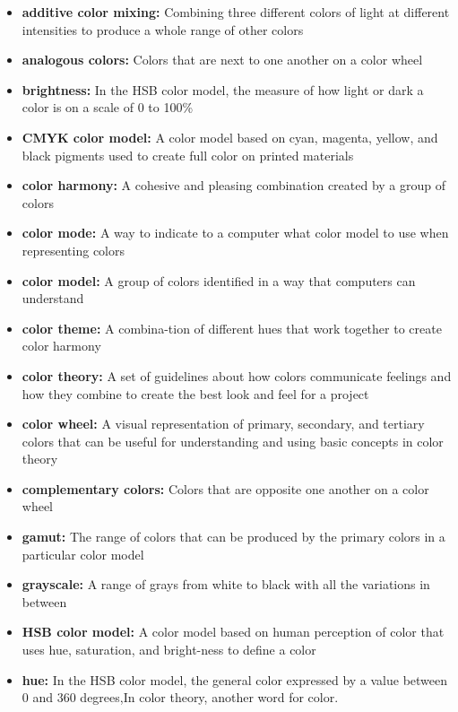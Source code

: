\documentclass{report}
\begin{document}
     \bigbreak \noindent \bigbreak \noindent
    \begin{itemize}
        \item \textbf{additive color mixing:} Combining three different colors of light at different intensities to produce a whole range of other colors
        \item \textbf{analogous colors:} Colors that are next to one another on a color wheel
        \item \textbf{brightness:} In the HSB color model, the measure of how light or dark a color is on a scale of 0 to 100\%
        \item \textbf{CMYK color model:} A color model based on cyan, magenta, yellow, and black pigments used to create full color on printed materials
        \item \textbf{color harmony:} A cohesive and pleasing combination created by a group of colors
        \item \textbf{color mode:} A way to indicate to a computer what color model to use when representing colors
        \item \textbf{color model:} A group of colors identified in a way that computers can understand
        \item \textbf{color theme:} A combina-tion of different hues that work together to create color harmony
        \item \textbf{color theory:} A set of guidelines about how colors communicate feelings and how they combine to create the best look and feel for a project
        \item \textbf{color wheel:} A visual  representation of primary, secondary, and tertiary colors that can be useful for understanding and using  basic concepts in color theory
        \item \textbf{complementary colors:} Colors that are opposite one another on a color wheel
        \item \textbf{gamut:} The range of colors that can be produced by the primary colors in a particular color model
        \item \textbf{grayscale:} A range of grays from white to black with all the variations in between
        \item \textbf{HSB color model:} A color model based on human perception of color that uses hue, saturation, and bright-ness to define a color
        \item \textbf{hue:} In the HSB color model, the general color expressed by a value between 0 and 360 degrees,In color theory, another word for color.

\end{itemize}
\end{document}
